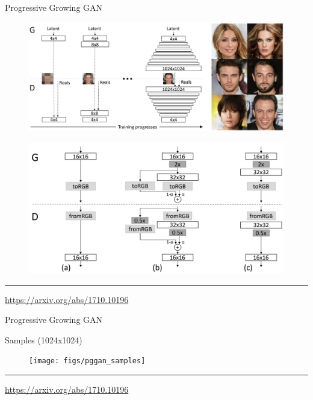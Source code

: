 \documentclass{beamer}
\begin{document}
\begin{frame}{Progressive Growing GAN}
	\begin{figure}
		\centering
		\includegraphics[width=0.8\linewidth]{figs/pggan_arch}
	\end{figure}
	\begin{figure}
		\centering
		\includegraphics[width=0.6\linewidth]{figs/pggan_fadein}
	\end{figure}
	\vfill
	\hrule\medskip 
	{\scriptsize \href{https://arxiv.org/abs/1710.10196}{https://arxiv.org/abs/1710.10196}}
\end{frame}
\begin{frame}{Progressive Growing GAN}
	\begin{block}{Samples (1024x1024)}
		\begin{figure}
			\centering
			\texttt{[image: figs/pggan\_samples]}
		\end{figure}
	\end{block}
	\vfill
	\hrule\medskip 
	{\scriptsize \href{https://arxiv.org/abs/1710.10196}{https://arxiv.org/abs/1710.10196}}
\end{frame}
\end{document}
